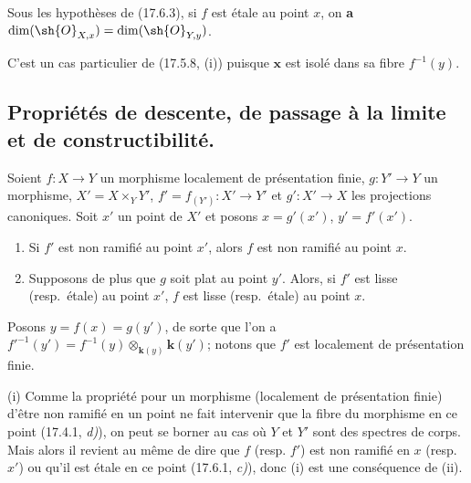 \begin{proposition}[17.6.4]
\label{IV.17.6.4}
Sous les hypothèses de \textup{(17.6.3)}, si $f$ est étale au point $x$, on \textbf{a} $\dim(\sh{O}_{X,x})=\dim(\sh{O}_{Y,y})$.
\end{proposition}

C'est un cas particulier de (17.5.8, (i)) puisque $\boldsymbol{x}$ est isolé dans sa fibre $f^{-1}(y)$.


\subsection{Propriétés de descente, de passage à la limite et de constructibilité.}
\label{IV.17.7}

\begin{proposition}[17.7.1]
\label{IV.17.7.1}
Soient $f:X\to Y$ un morphisme localement de présentation finie, $g:Y'\to Y$ un morphisme, $X'=X\times_Y Y'$, $f'=f_{(Y')}:X'\to Y'$ et $g':X'\to X$ les projections canoniques. Soit $x'$ un point de $X'$ et posons $x=g'(x')$, $y'=f'(x')$.
\begin{enumerate}
  \item[\textup{(i)}] Si $f'$ est non ramifié au point $x'$, alors $f$ est non ramifié au point $x$.
  \item[\textup{(ii)}] Supposons de plus que $g$ soit plat au point $y'$. Alors, si $f'$ est lisse \textup{(resp.}\ étale\textup{)} au point $x'$, $f$ est lisse \textup{(resp.}\ étale\textup{)} au point $x$.
\end{enumerate}
\end{proposition}

Posons $y=f(x)=g(y')$, de sorte que l'on a $f'^{-1}(y')=f^{-1}(y)\otimes_{\mathbf{k}(y)}\boldsymbol{k}(y')$; notons que $f'$ est localement de présentation finie.

(i) Comme la propriété pour un morphisme (localement de présentation finie) d'être non ramifié en un point ne fait intervenir que la fibre du morphisme en ce point (17.4.1, \emph{d)}), on peut se borner au cas où $Y$ et $Y'$ sont des spectres de corps. Mais alors il revient au même de dire que $f$ (resp. $f'$) est non ramifié en $x$ (resp. $x'$) ou qu'il est étale en ce point (17.6.1, \emph{c)}), donc (i) est une conséquence de (ii).

